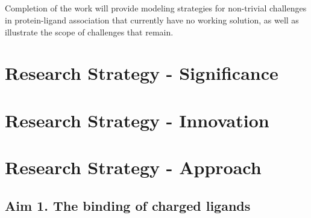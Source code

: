 \documentclass[10pt]{article}
\newif\ifinstr
\newcommand{\instr}[1]{\ifinstr {\color{cyan}\emph{#1}} \fi}
\begin{document}
\subsection*{}

Completion of the work will provide modeling strategies for non-trivial challenges in protein-ligand association that currently have no working solution, as well as illustrate the scope of challenges that remain.

\section*{Research Strategy - Significance}
\instr{General background, significance in terms of basic science and disease relevance.}


\section*{Research Strategy - Innovation}
\instr{Explain how your proposal differs from what others have tried.}

\section*{Research Strategy - Approach}
\instr{Approach: More specific background information. Describe in detail the experimental design and research methods to be used. Technical hurdles to be overcome should be mentioned. Alternative approaches should be given for experiments that may not be feasible. Discussion of expected or possible results and their interpretation. Best format for each specific aim: a) rationale, b) methods, c) expected results, d) alternatives. Theory aims should follow a similar structure where possible.}



\subsection*{Aim 1. The binding of charged ligands}
\end{document}
